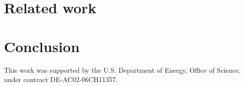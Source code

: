 \documentclass[sigconf,nonacm]{acmart}
\newcommand{\ryan}[1]{}
\newcommand{\ryan}[1]{{\textcolor{magenta}{ Ryan: #1 }}}
\begin{document}
\section{Related work}\label{sec:related}



\section{Conclusion}\label{sec:conclusion}


\begin{acks}
This work was supported by the U.S. Department of Energy, Office of Science, under contract DE-AC02-06CH11357.
\end{acks}



\end{document}
